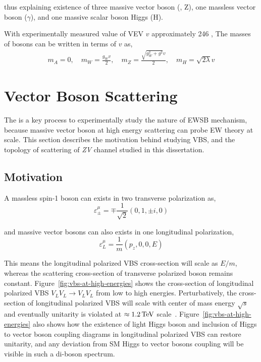 thus explaining existence of three massive vector boson (\Wplusminus{}, Z), one massless
vector boson (\( \gamma \)), and one massive scalar boson Higgs (H).

With experimentally measured value of \gls{VEV} \( v \) approximately 246 \GeV{},
The masses of bosons can be written in terms of \( v \) as,
%
\begin{align}
  m_A = 0, \quad
  m_W = \frac{g_{W} v}{2}, \quad
  m_Z = \frac{\sqrt{g^{2}_{W} + g^{2}} v }{2}, \quad
  m_H = \sqrt{2\lambda} v
\end{align}

\section{
  Vector Boson Scattering
 }\label{ch_intro:vbs}

The  is a key process to experimentally study the nature of
\gls{EWSB} mechanism, because massive vector boson at high energy
scattering can probe \gls{EW} theory at \TeV{} scale.
This section describes the motivation behind studying \gls{VBS}, and
the topology of scattering of \textit{ZV} channel studied in this dissertation.

\subsection{Motivation}

A massless spin-1 boson can exists in two transverse polarization as,
%
\begin{equation}
  \varepsilon^{\mu}_{\pm} = \mp \frac{1}{\sqrt{2}} (0, 1, \pm i, 0)
\end{equation}

and massive vector bosons can also exists in one longitudinal polarization,
%
\begin{equation}
  \varepsilon^{\mu}_{L} = \frac{1}{m} (p_z, 0, 0 , E)
\end{equation}

This means the longitudinal polarized \gls{VBS} cross-section will scale as \( E/m \),
whereas the scattering cross-section of transverse polarized boson remains constant.
Figure~\ref{fig:vbs-at-high-energies} shows the cross-section
of longitudinal polarized \gls{VBS} \( V_L V_L \to V_L V_L\)
from low to high energies. Perturbatively, the cross-section of
longitudinal polarized \gls{VBS} will scale with center of mass energy
\( \sqrt{s} \) and eventually unitarity is violated at
\( \approx 1.2 \,\text{Te\hspace{-.08em}V}{} \) scale~\cite{Lee1977,Lee1977a}.
Figure~\ref{fig:vbs-at-high-energies} also shows
how the existence of light Higgs boson and
inclusion of Higgs to vector boson coupling diagrams in longitudinal
polarized \gls{VBS} can restore unitarity,
and any deviation from \gls{SM} Higgs to vector
bosons coupling will be visible in such a di-boson spectrum.

